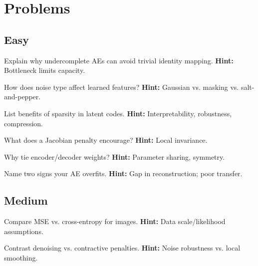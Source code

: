 
\section*{Problems}

\subsection*{Easy}
\begin{problem}[Undercomplete AE]
Explain why undercomplete AEs can avoid trivial identity mapping.
\textbf{Hint:} Bottleneck limits capacity.
\end{problem}

\begin{problem}
How does noise type affect learned features?
\textbf{Hint:} Gaussian vs. masking vs. salt-and-pepper.
\end{problem}

\begin{problem}
List benefits of sparsity in latent codes.
\textbf{Hint:} Interpretability, robustness, compression.
\end{problem}

\begin{problem}
What does a Jacobian penalty encourage?
\textbf{Hint:} Local invariance.
\end{problem}

\begin{problem}
Why tie encoder/decoder weights?
\textbf{Hint:} Parameter sharing, symmetry.
\end{problem}

\begin{problem}[Overfitting]
Name two signs your AE overfits.
\textbf{Hint:} Gap in reconstruction; poor transfer.
\end{problem}

\subsection*{Medium}
\begin{problem}
Compare MSE vs. cross-entropy for images.
\textbf{Hint:} Data scale/likelihood assumptions.
\end{problem}

\begin{problem}
Contrast denoising vs. contractive penalties.
\textbf{Hint:} Noise robustness vs. local smoothing.
\end{problem}

